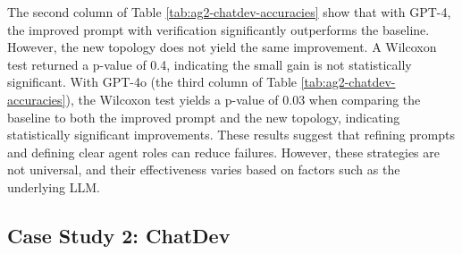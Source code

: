 The second column of Table \ref{tab:ag2-chatdev-accuracies} show that with GPT-4, the improved prompt with verification significantly outperforms the baseline. However, the new topology does not yield the same improvement. A Wilcoxon test returned a p-value of 0.4, indicating the small gain is not statistically significant. With GPT-4o (the third column of Table \ref{tab:ag2-chatdev-accuracies}), the Wilcoxon test yields a p-value of 0.03 when comparing the baseline to both the improved prompt and the new topology, indicating statistically significant improvements.
These results suggest that refining prompts and defining clear agent roles can reduce failures.
However, these strategies are not universal, and their effectiveness varies based on factors such as the underlying LLM.


\subsection{Case Study 2: ChatDev} 

